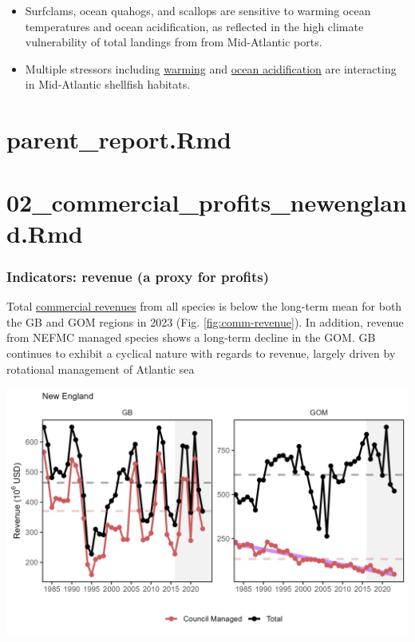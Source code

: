 \documentclass[
  10pt,
]{article}
\providecommand{\tightlist}{%
  \setlength{\itemsep}{0pt}\setlength{\parskip}{0pt}}
\let\origfigure\figure
\let\endorigfigure\endfigure
\renewenvironment{figure}[1][2] {
    \expandafter\origfigure\expandafter[H]
} {
    \endorigfigure
}
\begin{document}
\begin{itemize}
\tightlist
\item
  Surfclams, ocean quahogs, and scallops are sensitive to warming ocean temperatures and ocean acidification, as reflected in the high climate vulnerability of total landings from from Mid-Atlantic ports.
\item
  Multiple stressors including \href{https://noaa-edab.github.io/catalog/bottom_temp_insitu.html}{warming} and \href{https://noaa-edab.github.io/catalog/ocean_acidification}{ocean acidification} are interacting in Mid-Atlantic shellfish habitats.
\end{itemize}

\section{parent\_report.Rmd}\label{parent_report.rmd-3}

\section{02\_commercial\_profits\_newengland.Rmd}\label{commercial_profits_newengland.rmd}

\subsubsection{Indicators: revenue (a proxy for profits)}\label{indicators-revenue-a-proxy-for-profits-1}

Total \href{https://noaa-edab.github.io/catalog/comdat.html}{commercial revenues} from all species is below the long-term mean for both the GB and GOM regions in 2023 (Fig. \ref{fig:comm-revenue}). In addition, revenue from NEFMC managed species shows a long-term decline in the GOM. GB continues to exhibit a cyclical nature with regards to revenue, largely driven by rotational management of Atlantic sea

\begin{figure}

{\centering \includegraphics[width=6.5in]{images/NewEngland/comm_revenue_NewEngland_2025-09-09} 

}

\caption{Revenue through 2023 for the New England region: total (black) and from NEFMC managed species (red).}\label{fig:comm-revenue-81}
\end{figure}
\end{document}
